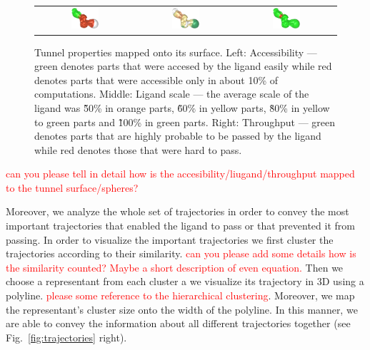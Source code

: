 \documentclass{svmult}
\newcommand{\red}[1]{\textcolor{red}{#1}}
\begin{document}
\begin{figure}
\centering
\begin{tabular}{ccc}
\includegraphics[width=0.3\textwidth]{fig/accessibility}
\quad & \quad
\includegraphics[width=0.3\textwidth]{fig/ligand-scale}
\quad & \quad
\includegraphics[width=0.3\textwidth]{fig/throughput}
\end{tabular}
\caption{Tunnel properties mapped onto its surface.
Left: Accessibility --- green denotes parts that were accesed by the ligand easily while red denotes parts that were accessible only in about 10\% of computations.
Middle: Ligand scale --- the average scale of the ligand was \~50\% in orange parts, \~60\% in yellow parts, \~80\% in yellow to green parts and \~100\% in green parts.
Right: Throughput --- green denotes parts that are highly probable to be passed by the ligand while red denotes those that were hard to pass.}
\label{fig:properties}
\end{figure}

\red{can you please tell in detail how is the accesibility/liugand/throughput mapped to the tunnel surface/spheres? }

Moreover, we analyze the whole set of trajectories in order to convey the most important trajectories that enabled the ligand to pass or that prevented it from passing.
In order to visualize the important trajectories we first cluster the trajectories according to their similarity. 
\red{can you please add some details how is the similarity counted? Maybe a short description of even equation.}
Then we choose a representant from each cluster a we visualize its trajectory in 3D using a polyline.
\red{please some reference to the hierarchical clustering}.
Moreover, we map the representant's cluster size onto the width of the polyline.
In this manner, we are able to convey the information about all different trajectories together (see Fig.~\ref{fig:trajectories} right).
\end{document}
